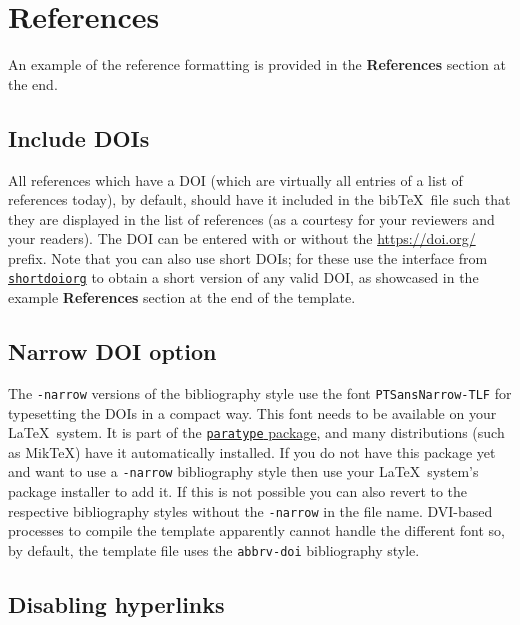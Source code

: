 \documentclass[journal]{vgtc}                     %
\begin{document}
\section{References}
\label{sec:references_inst}

An example of the reference formatting is provided in the \textbf{References} section at the end.


\subsection{Include DOIs}
\label{sec:references_inst:doi}

All references which have a DOI (which are virtually all entries of a list of references today), by default, should have it included in the bib\TeX\ file such that they are displayed in the list of references (as a courtesy for your reviewers and your readers).
The DOI can be entered with or without the \url{https://doi.org/} prefix. Note that you can also use short DOIs; for these use the interface from \href{https://shortdoi.org/}{\texttt{shortdoiorg}} to obtain a short version of any valid DOI, as showcased in the example \textbf{References} section at the end of the template.

\subsection{Narrow DOI option}

The \verb|-narrow| versions of the bibliography style use the font \verb|PTSansNarrow-TLF| for typesetting the DOIs in a compact way.
This font needs to be available on your \LaTeX\ system.
It is part of the \href{https://www.ctan.org/pkg/paratype}{\texttt{paratype} package}, and many distributions (such as MikTeX) have it automatically installed.
If you do not have this package yet and want to use a \verb|-narrow| bibliography style then use your \LaTeX\ system's package installer to add it.
If this is not possible you can also revert to the respective bibliography styles without the \verb|-narrow| in the file name.
DVI-based processes to compile the template apparently cannot handle the different font so, by default, the template file uses the \texttt{abbrv-doi} bibliography style.

\subsection{Disabling hyperlinks}
\end{document}
